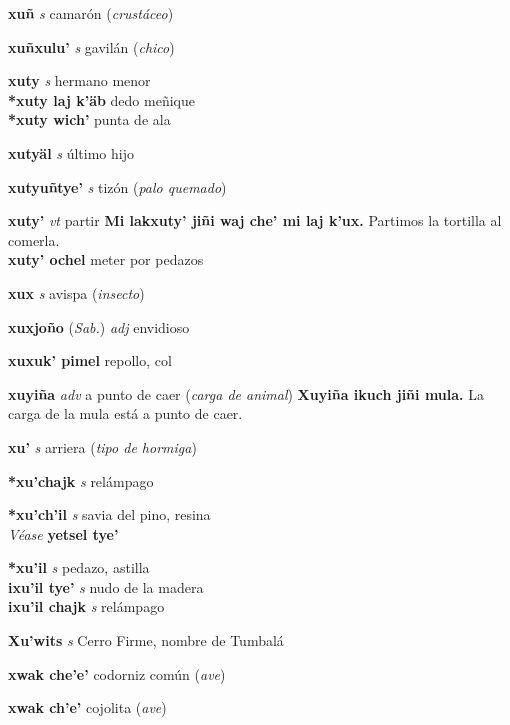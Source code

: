 \documentclass[10pt]{scrbook}
\newcommand{\entry}[1]{\textbf{#1}}
\newcommand{\partofspeech}[1]{\textit{#1}}
\newcommand{\spanishtranslation}[1]{#1}
\newcommand{\clarification}[1]{(\textit{#1})}
\newcommand{\cholexample}[1]{\textbf{#1}}
\newcommand{\exampletranslation}[1]{#1}
\newcommand{\alsosee}[1]{\\\textit{Véase} \textbf{#1}}
\newcommand{\relevantdialect}[1]{(\textit{#1})}
\newcommand{\secondaryentry}[1]{\\\textbf{#1}}
\newcommand{\secondpartofspeech}[1]{\textit{#1}}
\newcommand{\secondtranslation}[1]{#1}
\begin{document}
\begin{multicols}{2}
\entry{xuñ}
\partofspeech{s}
\spanishtranslation{camarón}
\clarification{crustáceo}

\entry{xuñxulu'}
\partofspeech{s}
\spanishtranslation{gavilán}
\clarification{chico}

\entry{xuty}
\partofspeech{s}
\spanishtranslation{hermano menor}
\secondaryentry{*xuty laj k'äb}
\secondtranslation{dedo meñique}
\secondaryentry{*xuty wich'}
\secondtranslation{punta de ala}

\entry{xutyäl}
\partofspeech{s}
\spanishtranslation{último hijo}

\entry{xutyuñtye'}
\partofspeech{s}
\spanishtranslation{tizón}
\clarification{palo quemado}

\entry{xuty'}
\partofspeech{vt}
\spanishtranslation{partir}
\cholexample{Mi lakxuty' jiñi waj che' mi laj k'ux.}
\exampletranslation{Partimos la tortilla al comerla.}
\secondaryentry{xuty' ochel}
\secondtranslation{meter por pedazos}

\entry{xux}
\partofspeech{s}
\spanishtranslation{avispa}
\clarification{insecto}

\entry{xuxjoño}
\relevantdialect{Sab.}
\partofspeech{adj}
\spanishtranslation{envidioso}

\entry{xuxuk' pimel}
\spanishtranslation{repollo, col}

\entry{xuyiña}
\partofspeech{adv}
\spanishtranslation{a punto de caer}
\clarification{carga de animal}
\cholexample{Xuyiña ikuch jiñi mula.}
\exampletranslation{La carga de la mula está a punto de caer.}

\entry{xu'}
\partofspeech{s}
\spanishtranslation{arriera}
\clarification{tipo de hormiga}

\entry{*xu'chajk}
\partofspeech{s}
\spanishtranslation{relámpago}

\entry{*xu'ch'il}
\partofspeech{s}
\spanishtranslation{savia del pino, resina}
\alsosee{yetsel tye'}

\entry{*xu'il}
\partofspeech{s}
\spanishtranslation{pedazo, astilla}
\secondaryentry{ixu'il tye'}
\secondpartofspeech{s}
\secondtranslation{nudo de la madera}
\secondaryentry{ixu'il chajk}
\secondpartofspeech{s}
\secondtranslation{relámpago}

\entry{Xu'wits}
\partofspeech{s}
\spanishtranslation{Cerro Firme, nombre de Tumbalá}

\entry{xwak che'e'}
\spanishtranslation{codorniz común}
\clarification{ave}

\entry{xwak ch'e'}
\spanishtranslation{cojolita}
\clarification{ave}


\end{multicols}
\end{document}
